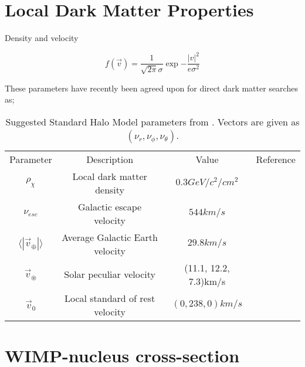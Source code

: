 \section{Local Dark Matter Properties}
\par
Density and velocity


\begin{equation}
    f(\Vec{v}) = \frac{1}{\sqrt{2\pi}\sigma} \exp{-\frac{|v|^2}{e\sigma^2}} 
\end{equation}

These parameters have recently been agreed upon for direct dark matter searches as;

\begin{table}[]
    \centering
    \begin{tabular}{c|c|c|c}
        Parameter                               & Description               & Value             & Reference \\
        $\rho_\chi$                             & Local dark matter density & $0.3GeV/c^2/cm^2$ &            \\
        $\nu_{esc}$                             & Galactic escape velocity  & $544km/s$ &            \\
        $\langle|\Vec{v}_{\oplus}|\rangle$      & Average Galactic Earth velocity & $29.8km/s$ &            \\
        $\Vec{v}_{\circledast}$ & Solar peculiar velocity & (11.1, 12.2, 7.3)km/s &            \\
        $\Vec{v}_0$ & Local standard of rest velocity & $(0,238,0)km/s$ &            
         
    \end{tabular}
    \caption{Suggested Standard Halo Model parameters from \cite{standard_halo_model_conventions_ref}. Vectors are given as $(\nu_r,\nu_\phi,\nu_\theta)$.}
    \label{tab:my_label}
\end{table}



\section{WIMP-nucleus cross-section}
\par

